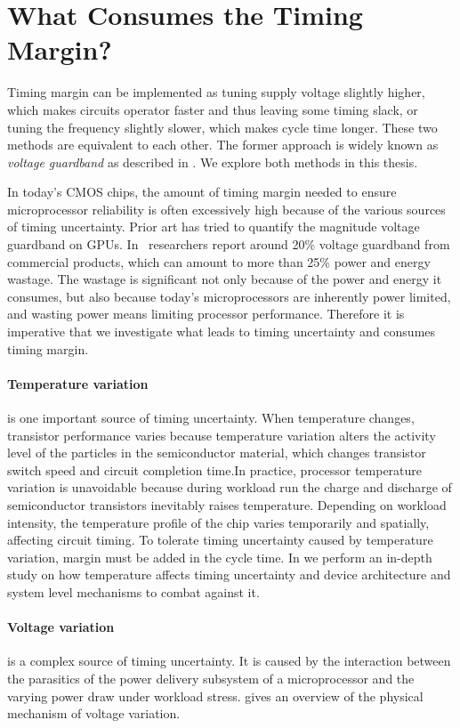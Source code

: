 \section{What Consumes the Timing Margin?}
\label{sec:background:components}

Timing margin can be implemented as tuning supply voltage slightly higher, which makes circuits operator faster and thus leaving some timing slack, or tuning the frequency slightly slower, which makes cycle time longer. These two methods are equivalent to each other. The former approach is widely known as \textit{voltage guardband} as described in . We explore both methods in this thesis.

In today's CMOS chips, the amount of timing margin needed to ensure microprocessor reliability is often excessively high because of the various sources of timing uncertainty. Prior art has tried to quantify the magnitude voltage guardband on GPUs. In~\cite{leng2015safe} researchers report around 20\% voltage guardband from commercial products, which can amount to more than 25\% power and energy wastage. The wastage is significant not only because of the power and energy it consumes, but also because today's microprocessors are inherently power limited, and wasting power means limiting processor performance. Therefore it is imperative that we investigate what leads to timing uncertainty and consumes timing margin. 

\paragraph{Temperature variation} is one important source of timing uncertainty. When temperature changes, transistor performance varies because temperature variation alters the activity level of the particles in the semiconductor material, which changes transistor switch speed and circuit completion time.In practice, processor temperature variation is unavoidable because during workload run the charge and discharge of semiconductor transistors inevitably raises temperature. Depending on workload intensity, the temperature profile of the chip varies temporarily and spatially, affecting circuit timing. To tolerate timing uncertainty caused by temperature variation, margin must be added in the cycle time. In \label{sec:tistate} we perform an in-depth study on how temperature affects timing uncertainty and device architecture and system level mechanisms to combat against it.

\paragraph{Voltage variation} is a complex source of timing uncertainty. It is caused by the interaction between the parasitics of the power delivery subsystem of a microprocessor and the varying power draw under workload stress.  gives an overview of the physical mechanism of voltage variation.

